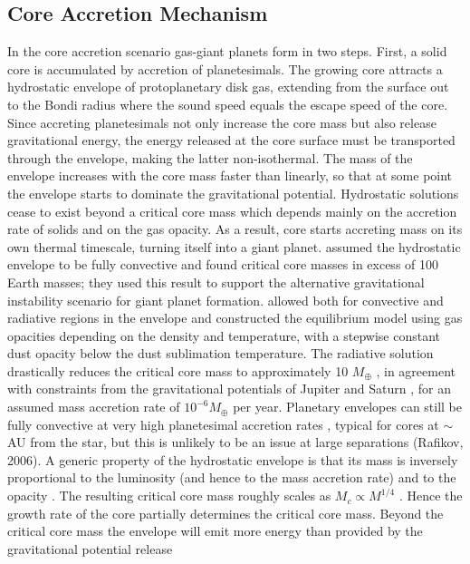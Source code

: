 \subsection{Core Accretion Mechanism}
In the core accretion scenario gas-giant planets form in two steps. First, a solid core is accumulated by accretion of
planetesimals. The growing core attracts a hydrostatic envelope of protoplanetary disk gas, extending from the 
surface out to the Bondi radius where the sound speed equals the escape speed of the core. Since accreting planetesimals
not only increase the core mass but also release gravitational energy, the energy released at the core surface must
be transported through the envelope, making the latter non-isothermal. The mass of the envelope increases with the
core mass faster than linearly, so that at some point the envelope starts to dominate the gravitational potential. 
Hydrostatic solutions cease to exist beyond a critical core mass which depends mainly on the accretion rate of solids and on
the gas opacity. As a result, core starts accreting mass on its own thermal timescale, turning itself into a giant planet.
\cite{Perri1974} assumed the hydrostatic envelope to be fully convective and found critical core masses
in excess of 100 Earth masses; they used this result to support the alternative gravitational instability scenario for
giant planet formation. \cite{Mizuno1980} allowed both for convective and radiative regions in the envelope and constructed 
the equilibrium model using gas opacities depending on the density and temperature, with a stepwise constant
dust opacity below the dust sublimation temperature. The radiative solution drastically reduces the critical core mass
to approximately 10 $M_\oplus$ , in agreement with constraints from the gravitational potentials of Jupiter and Saturn 
\citep{Guillot2005}, for an assumed mass accretion rate of $10^{−6} M_\oplus$ per year. Planetary envelopes can still be fully convective
at very high planetesimal accretion rates \citep{Wuchterl1993, Ikoma2001, Rafikov2006}, typical for cores at $\sim$AU
from the star, but this is unlikely to be an issue at large separations (Rafikov, 2006).
A generic property of the hydrostatic envelope is that its mass is inversely proportional to the luminosity (and hence
to the mass accretion rate) and to the opacity \citep{Stevenson1982}. The resulting critical core mass roughly scales as
$M_c \propto M^{1/4}$ \citep{Ikoma2000}. Hence the growth rate of the core partially determines the critical core mass. 
Beyond the critical core mass the envelope will emit more energy than provided by the gravitational potential release
